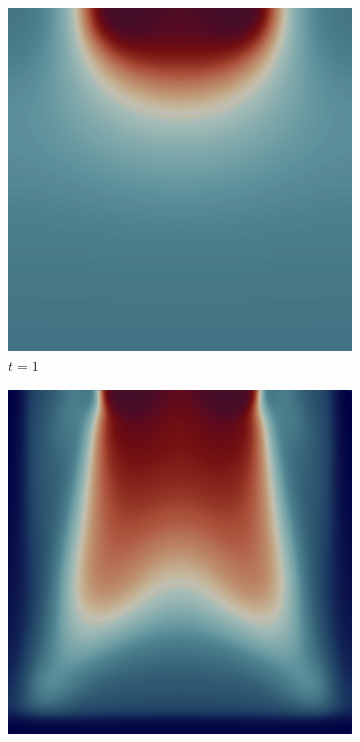 \begin{figure}[H]
    \centering
    \caption{Unit Square with Single Sink: Filtered Distribution}
    \begin{subfigure}{.4\textwidth}
        \includegraphics[width=\textwidth]{imgs/UnitSquare_1/first.png}
        \caption{$t = 1$}
    \end{subfigure}
    \begin{subfigure}{.4\textwidth}
        \includegraphics[width=\textwidth]{imgs/UnitSquare_1/second.png}

\end{subfigure}
\end{figure}
